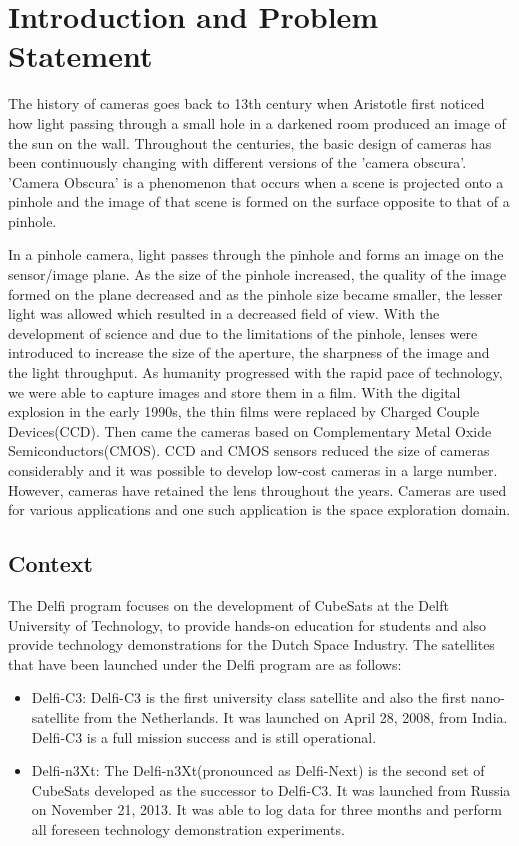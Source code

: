 \chapter{Introduction and Problem Statement}
\label{chp:introduction}
The history of cameras goes back to 13th century when Aristotle first noticed how light passing through a small hole in a darkened room produced an image of the sun on the wall. 
Throughout the centuries, the basic design of cameras has been continuously changing with different versions of the 'camera obscura'. 'Camera Obscura' is a phenomenon that occurs when a scene is projected onto a pinhole and the image of that scene is formed on the surface opposite to that of a pinhole. 

In a pinhole camera, light passes through the pinhole and forms an image on the sensor/image plane. As the size of the pinhole increased, the quality of the image formed on the plane decreased and as the pinhole size became smaller, the lesser light was allowed which resulted in a decreased field of view. With the development of science and due to the limitations of the pinhole, lenses were introduced to increase the size of the aperture, the sharpness of the image and the light throughput. As humanity progressed with the rapid pace of technology, we were able to capture images and store them in a film. With the digital explosion in the early 1990s, the thin films were replaced by Charged Couple Devices(CCD). Then came the cameras based on Complementary Metal Oxide Semiconductors(CMOS). CCD and CMOS sensors reduced the size of cameras considerably and it was possible to develop low-cost cameras in a large number. However, cameras have retained the lens throughout the years. Cameras are used for various applications and one such application is the space exploration domain. 

\section{Context}
The Delfi program focuses on the development of CubeSats at the Delft University of Technology, to provide hands-on education for students and also provide technology demonstrations for the Dutch Space Industry. The satellites that have been launched under the Delfi program are as follows:
\begin{itemize}
\item Delfi-C3: Delfi-C3 is the first university class satellite and also the first nano-satellite from the Netherlands. It was launched on April 28, 2008, from India. Delfi-C3 is a full mission success and is still operational\cite{DelfiC3}.
\item Delfi-n3Xt: The Delfi-n3Xt(pronounced as Delfi-Next) is the second set of CubeSats developed as the successor to Delfi-C3. It was launched from Russia on November 21, 2013. It was able to log data for three months and perform all foreseen technology demonstration experiments.
\end{itemize}

